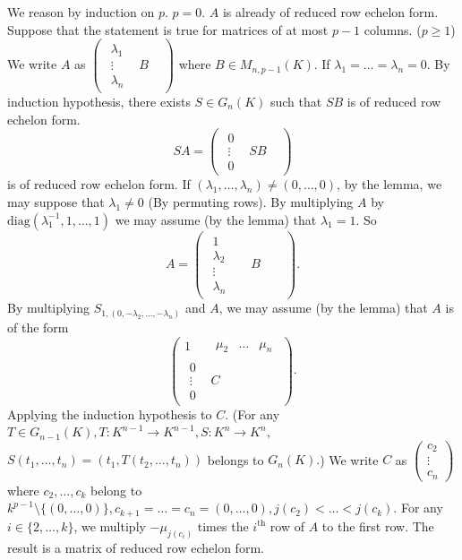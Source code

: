 \begin{proofenv}
    We reason by induction on $p$.
    \newline
    $p=0$. $A$ is already of reduced row echelon form.
    \newline
    Suppose that the statement is true for matrices of at most $p-1$ columns. ($p\ge 1$) We write $A$ as $\begin{pmatrix}
 \begin{matrix}
 \lambda _1\\
 \vdots\\
\lambda _n
\end{matrix} &B&
\end{pmatrix}$ where $B\in M_{n,p-1}(K)$. If $\lambda_1=\dots=\lambda_n=0$. By induction hypothesis, there exists $S\in G_n(K)$ such that $SB$ is of reduced row echelon form.
$$SA= \begin{pmatrix}\begin{matrix}
0\\
 \vdots\\
0
\end{matrix} &SB&
\end{pmatrix}$$
 is of reduced row echelon form. If $(\lambda_1,\dots,\lambda_n)\not=(0,\dots,0)$, by the lemma, we may suppose that $\lambda_1\not=0$ (By permuting rows). By multiplying $A$ by $\mathrm{diag}(\lambda_1^{-1},1,\dots,1)$ we may assume (by the lemma) that $\lambda_1=1$. So 
 $$A= \begin{pmatrix}\begin{matrix}
 1\\
\lambda _2\\
 \vdots\\
\lambda _n
\end{matrix} &&B&&
\end{pmatrix}.$$
By multiplying $S_{1,(0,-\lambda_2,\dots,-\lambda_n)}$ and $A$, we may assume (by the lemma) that $A$ is of the form 
$$\begin{pmatrix}
 1 &\begin{matrix}
  \mu_2& \dots &\mu_n
\end{matrix} \\
 \begin{matrix}
 0\\
 \vdots\\
0
\end{matrix} &C
\end{pmatrix}.$$
Applying the induction hypothesis to $C$.
(For any $T\in G_{n-1}(K), T:K^{n-1}\rightarrow K^{n-1}, S:K^n\rightarrow K^n$, $S(t_1,\dots,t_n)=(t_1,T(t_2,\dots,t_n))$ belongs to $G_n(K).$)
We write $C$ as $\begin{pmatrix}
    c_2\\
    \vdots\\
    c_n
\end{pmatrix}$
where $c_2,\dots,c_k$ belong to $k^{p-1}\setminus\{(0,\dots,0)\},c_{k+1}=\dots=c_n=(0,\dots,0),j(c_2)<\dots<j(c_k)$. For any $i\in \{2,\dots,k\}$, we multiply $-\mu_{j(c_i)}$ times the $i^{\text{th}}$ row of $A$ to the first row. The result is a matrix of reduced row echelon form.
\end{proofenv}


